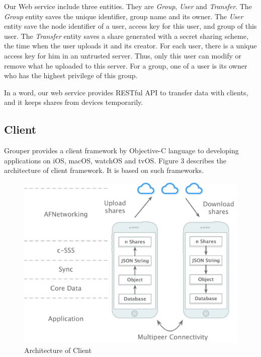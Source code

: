 \documentclass[twocolumn,10pt]{article}
\begin{document}
Our Web service include three entities. They are \emph{Group}, \emph{User} and \emph{Transfer}. The \emph{Group} entity saves the unique identifier, group name and its owner. The \emph{User} entity save the node identifier of a user, access key for this user, and group of this user. The \emph{Transfer} entity saves a share generated with a secret sharing scheme, the time when the user uploads it and its creator. For each user, there is a unique access key for him in an untrusted server. Thus, only this user can modify or remove what he uploaded to this server. For a group, one of a user is its owner who has the highest privilege of this group.

In a word, our web service provides RESTful API to transfer data with clients, and it keeps shares from devices temporarily.

\subsection{Client}

Grouper provides a client framework by Objective-C language to developing applications on iOS, macOS, watchOS and tvOS. Figure 3 describes the architecture of client framework. It is based on such frameworks.   

\begin{figure}[!htb]
	\centering
	\includegraphics[scale=0.35]{architecture}
	\caption{Architecture of Client}
\end{figure}
\end{document}
